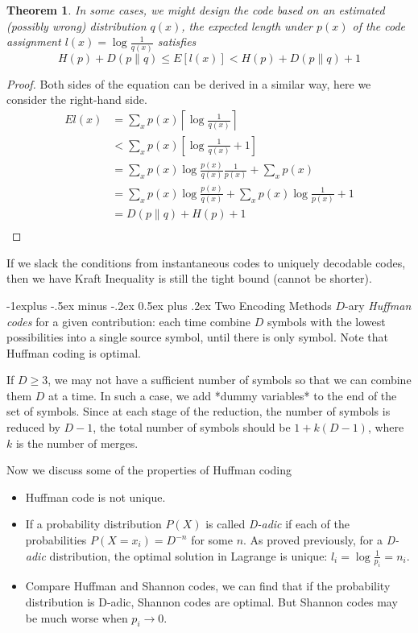 \documentclass[10pt,landscape, a4paper]{article}
\makeatletter
\newtheorem{theorem}{Theorem}
\renewcommand{\subsection}{\@startsection{subsection}{2}{0mm}%
                                {-1explus -.5ex minus -.2ex}%
                                {0.5ex plus .2ex}%
                                {\normalfont\normalsize\bfseries}}
\makeatother
\begin{document}
\begin{multicols}{3}
\begin{theorem}
    In some cases, we might design the code based on an estimated (possibly wrong) distribution $q(x)$, the expected length under $p(x)$ of the code assignment $l(x)=\log \frac{1}{q(x)}$ satisfies
    $$
    H(p)+D(p\parallel q)\le E[l(x)]<H(p)+D(p\parallel q)+1
    $$
\end{theorem}
\begin{proof}
    Both sides of the equation can be derived in a similar way, here we consider the right-hand side.
    $$
    \begin{aligned}
    El(x)&=\sum_x p(x)\left\lceil \log\frac{1}{q(x)}\right\rceil\\
    &<\sum_x p(x)\left[\log\frac{1}{q(x)}+1\right]\\
    &=\sum_x p(x)\log \frac{p(x)}{q(x)}\frac{1}{p(x)}+\sum_x p(x)\\
    &=\sum_xp(x)\log\frac{p(x)}{q(x)}+\sum_xp(x)\log\frac{1}{p(x)}+1\\
    &=D(p\parallel q)+H(p)+1\\
    \end{aligned}
    $$
\end{proof}
If we slack the conditions from instantaneous codes to uniquely decodable codes, then we have Kraft Inequality is still the tight bound (cannot be shorter).

\subsection{Two Encoding Methods}
$D$-ary \textit{Huffman codes} for a given contribution: each time combine $D$ symbols with the lowest possibilities into a single source symbol, until there is only symbol. Note that Huffman coding is optimal.

If $D\ge 3$, we may not have a sufficient number of symbols so that we can combine them $D$ at a time. In such a case, we add *dummy variables* to the end of the set of symbols. Since at each stage of the reduction, the number of symbols is reduced by $D-1$, the total number of symbols should be $1+k(D-1)$, where $k$ is the number of merges.

Now we discuss some of the properties of Huffman coding

\begin{itemize}
    \item Huffman code is not unique.
    \item If a probability distribution $P(X)$ is called \textit{D-adic} if each of the probabilities $P(X=x_i)=D^{-n}$ for some $n$. As proved previously, for a \textit{D-adic} distribution, the optimal solution in Lagrange is unique: $l_i=\log\frac{1}{p_i}=n_i$.
    \item Compare Huffman and Shannon codes, we can find that if the probability distribution is D-adic, Shannon codes are optimal. But Shannon codes may be much worse when $p_i\rightarrow 0$.
\end{itemize}


\end{multicols}
\end{document}
